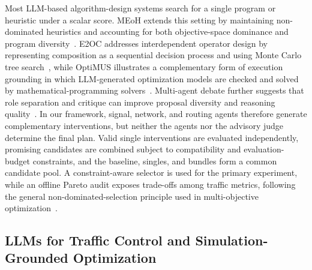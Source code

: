 Most LLM-based algorithm-design systems search for a single program or
heuristic under a scalar score. MEoH extends this setting by maintaining
non-dominated heuristics and accounting for both objective-space dominance and
program diversity~\cite{yao2025meoh}. E2OC addresses interdependent operator
design by representing composition as a sequential decision process and using
Monte Carlo tree search~\cite{qiu2026e2oc}, while OptiMUS illustrates a
complementary form of execution grounding in which LLM-generated optimization
models are checked and solved by mathematical-programming
solvers~\cite{ahmaditeshnizi2024optimus}. Multi-agent debate further suggests that
role separation and critique can improve proposal diversity and reasoning
quality~\cite{du2024debate}. In our framework, signal, network, and routing
agents therefore generate complementary interventions, but neither the agents
nor the advisory judge determine the final plan. Valid single interventions
are evaluated independently, promising candidates are combined subject to
compatibility and evaluation-budget constraints, and the baseline, singles,
and bundles form a common candidate pool. A constraint-aware selector is used
for the primary experiment, while an offline Pareto audit exposes trade-offs
among traffic metrics, following the general non-dominated-selection principle
used in multi-objective optimization~\cite{deb2002nsgaii}.

\subsection{LLMs for Traffic Control and Simulation-Grounded Optimization}

